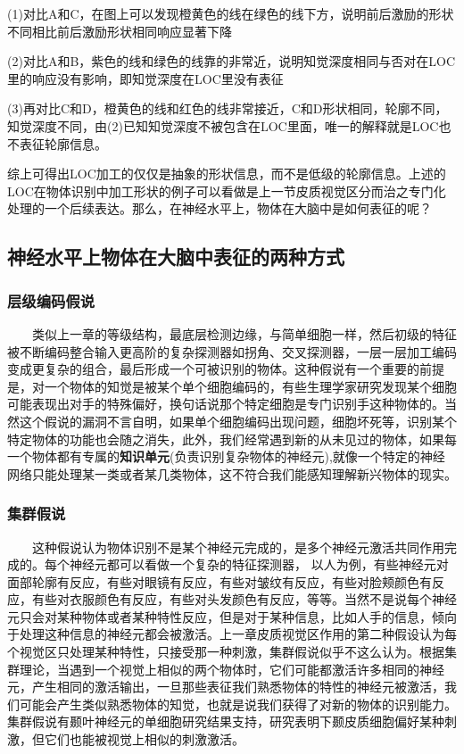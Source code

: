 \documentclass{article}
\begin{document}
\begin{spacing}{1.0}
(1)对比A和C，在图上可以发现橙黄色的线在绿色的线下方，说明前后激励的形状不同相比前后激励形状相同响应显著下降\par 
(2)对比A和B，紫色的线和绿色的线靠的非常近，说明知觉深度相同与否对在LOC里的响应没有影响，即知觉深度在LOC里没有表征\par 
(3)再对比C和D，橙黄色的线和红色的线非常接近，C和D形状相同，轮廓不同，知觉深度不同，由(2)已知知觉深度不被包含在LOC里面，唯一的解释就是LOC也不表征轮廓信息。\par 
 综上可得出LOC加工的仅仅是抽象的形状信息，而不是低级的轮廓信息。上述的LOC在物体识别中加工形状的例子可以看做是上一节皮质视觉区分而治之专门化处理的一个后续表达。那么，在神经水平上，物体在大脑中是如何表征的呢？
\subsection{神经水平上物体在大脑中表征的两种方式}
\subsubsection{层级编码假说}
\ \ \ \ 类似上一章的等级结构，最底层检测边缘，与简单细胞一样，然后初级的特征被不断编码整合输入更高阶的复杂探测器如拐角、交叉探测器，一层一层加工编码变成更复杂的组合，最后形成一个可被识别的物体。这种假说有一个重要的前提是，对一个物体的知觉是被某个单个细胞编码的，有些生理学家研究发现某个细胞可能表现出对手的特殊偏好，换句话说那个特定细胞是专门识别手这种物体的。当然这个假说的漏洞不言自明，如果单个细胞编码出现问题，细胞坏死等，识别某个特定物体的功能也会随之消失，此外，我们经常遇到新的从未见过的物体，如果每一个物体都有专属的\textbf{知识单元}(负责识别复杂物体的神经元),就像一个特定的神经网络只能处理某一类或者某几类物体，这不符合我们能感知理解新兴物体的现实。
\subsubsection{集群假说}
\ \ \ \ 这种假说认为物体识别不是某个神经元完成的，是多个神经元激活共同作用完成的。每个神经元都可以看做一个复杂的特征探测器， 以人为例，有些神经元对面部轮廓有反应，有些对眼镜有反应，有些对皱纹有反应，有些对脸颊颜色有反应，有些对衣服颜色有反应，有些对头发颜色有反应，等等。当然不是说每个神经元只会对某种物体或者某种特性反应，但是对于某种信息，比如人手的信息，倾向于处理这种信息的神经元都会被激活。上一章皮质视觉区作用的第二种假设认为每个视觉区只处理某种特性，只接受那一种刺激，集群假说似乎不这么认为。根据集群理论，当遇到一个视觉上相似的两个物体时，它们可能都激活许多相同的神经元，产生相同的激活输出，一旦那些表征我们熟悉物体的特性的神经元被激活，我们可能会产生类似熟悉物体的知觉，也就是说我们获得了对新的物体的识别能力。集群假说有颞叶神经元的单细胞研究结果支持，研究表明下颞皮质细胞偏好某种刺激，但它们也能被视觉上相似的刺激激活。\cite{main} \par 


\end{spacing}
\end{document}
